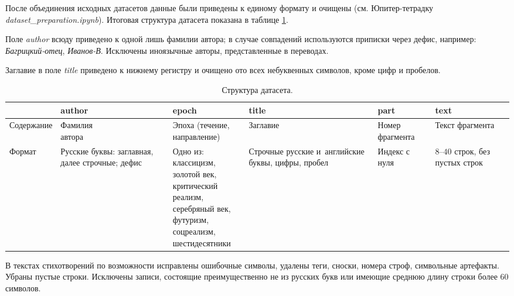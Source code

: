 \documentclass[a4paper,12pt]{article}
\begin{document}
После объединения исходных датасетов данные были приведены к единому формату и очищены (см. Юпитер-тетрадку \textit{dataset\_preparation.ipynb}). Итоговая структура датасета показана в таблице \ref{tab:dataset}.

Поле \textit{author} всюду приведено к одной лишь фамилии автора; в случае совпадений используются приписки через дефис, например: \textit{Багрицкий-отец}, \textit{Иванов-В}. Исключены иноязычные авторы, представленные в переводах.

Заглавие в поле \textit{title} приведено к нижнему регистру и очищено ото всех небуквенных символов, кроме цифр и пробелов.

\begin{table}[t]
\centering
\begin{tabular}[t]{|m{1.4cm}|m{2.8cm}|m{4.2cm}|m{2.9cm}|m{1.3cm}|m{1.4cm}|}
    \hline
    & \textbf{author} & \textbf{epoch} & \textbf{title} & \textbf{part} & \textbf{text} \\
    \hline
    \hline
    Содер\-жание & \makecell[l]{Фамилия \\ автора} \par & \makecell[l]{Эпоха (течение, \\ направление)} \par & Заглавие & Номер фрагмента & Текст фрагмента \\
    \hline
    Формат & Русские буквы: заглавная, далее строчные; дефис & \makecell[l]{Одно из: \\ классицизм, \\ золотой век, \\ критический реализм, \\ серебряный век, \\ футуризм, \\ соцреализм, \\ шестидесятники} \par & Строчные русские и~английские буквы, цифры, пробел & Индекс с нуля & $8$--$40$ строк, без пустых строк \\
    \hline
\end{tabular}
\caption{Структура датасета.}
\label{tab:dataset}
\end{table}

В текстах стихотворений по возможности исправлены ошибочные символы, удалены теги, сноски, номера строф, символьные артефакты. Убраны пустые строки. Исключены записи, состоящие преимущественно не из русских букв или имеющие среднюю длину строки более $60$ символов.
\end{document}
